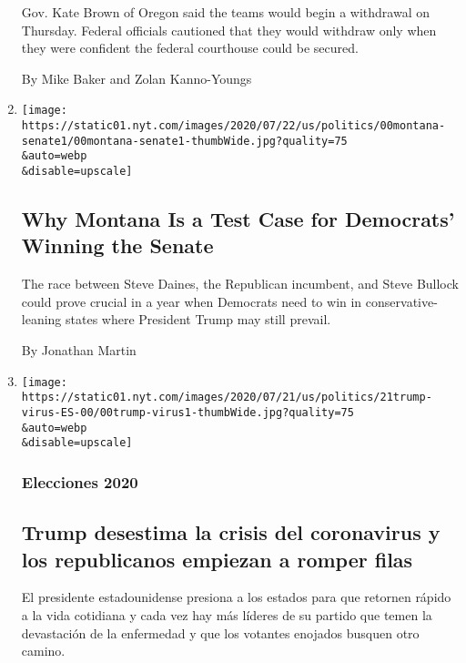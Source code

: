 \begin{enumerate}
  Gov. Kate Brown of Oregon said the teams would begin a withdrawal on
  Thursday. Federal officials cautioned that they would withdraw only
  when they were confident the federal courthouse could be secured.

  By Mike Baker and Zolan Kanno-Youngs
\item
  \href{/2020/07/27/us/politics/montana-senate-bullock-daines.html}{}

  \texttt{[image: https://static01.nyt.com/images/2020/07/22/us/politics/00montana-senate1/00montana-senate1-thumbWide.jpg?quality=75\\\&auto=webp\\\&disable=upscale]}

  \hypertarget{why-montana-is-a-test-case-for-democrats-winning-the-senate}{%
  \subsection{Why Montana Is a Test Case for Democrats' Winning the
  Senate}\label{why-montana-is-a-test-case-for-democrats-winning-the-senate}}

  The race between Steve Daines, the Republican incumbent, and Steve
  Bullock could prove crucial in a year when Democrats need to win in
  conservative-leaning states where President Trump may still prevail.

  By Jonathan Martin
\item
  \href{/es/2020/07/21/espanol/estados-unidos/donald-trump-coronavirus-republicanos.html}{}

  \texttt{[image: https://static01.nyt.com/images/2020/07/21/us/politics/21trump-virus-ES-00/00trump-virus1-thumbWide.jpg?quality=75\\\&auto=webp\\\&disable=upscale]}

  \hypertarget{elecciones-2020}{%
  \subsubsection{Elecciones 2020}\label{elecciones-2020}}

  \hypertarget{trump-desestima-la-crisis-del-coronavirus-y-los-republicanos-empiezan-a-romper-filas}{%
  \subsection{Trump desestima la crisis del coronavirus y los
  republicanos empiezan a romper
  filas}\label{trump-desestima-la-crisis-del-coronavirus-y-los-republicanos-empiezan-a-romper-filas}}

  El presidente estadounidense presiona a los estados para que retornen
  rápido a la vida cotidiana y cada vez hay más líderes de su partido
  que temen la devastación de la enfermedad y que los votantes enojados
  busquen otro camino.


\end{enumerate}
